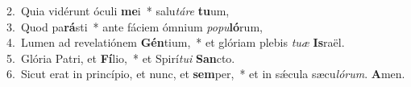 {2.~}Quia vidérunt óculi \textbf{me}i~* salu\textit{tá}\textit{re} \textbf{tu}um,\\
{3.~}Quod pa\textbf{rá}sti~* ante fáciem ómnium \textit{po}\textit{pu}\textbf{ló}rum,\\
{4.~}Lumen ad revelatiónem \textbf{Gén}tium,~* et glóriam plebis \textit{tu}\textit{æ} \textbf{Is}raël.\\
{5.~}Glória Patri, et \textbf{Fí}lio,~* et Spirí\textit{tu}\textit{i} \textbf{San}cto.\\
{6.~}Sicut erat in princípio, et nunc, et \textbf{sem}per,~* et in sǽcula sæcu\textit{ló}\textit{rum}. \textbf{A}men.\\

